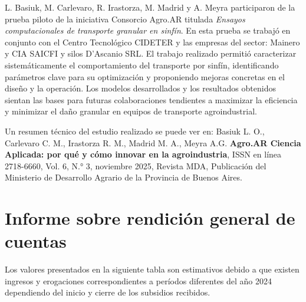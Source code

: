 \documentclass[a4paper,11pt,twoside,final,titlepage,onecolumn,openright]{report}
\begin{document}
L. Basiuk, M. Carlevaro, R. Irastorza, M. Madrid y A. Meyra participaron de la prueba piloto de la iniciativa Consorcio Agro.AR titulada \textit{Ensayos computacionales de transporte granular en sinfín}. En esta prueba se trabajó en conjunto con el Centro Tecnológico CIDETER y las empresas del sector: Mainero y CIA SAICFI y silos D’Ascanio SRL. El trabajo realizado permitió caracterizar sistemáticamente el comportamiento del transporte por sinfín, identificando parámetros clave para su optimización y proponiendo mejoras concretas en el diseño y la operación. Los modelos desarrollados y los resultados obtenidos sientan las bases para futuras colaboraciones tendientes a maximizar la eficiencia y minimizar el daño granular en equipos de transporte agroindustrial.

Un resumen técnico del estudio realizado se puede ver en: Basiuk L. O., Carlevaro C. M., Irastorza R. M., Madrid M. A., Meyra A.G. \textbf{Agro.AR Ciencia Aplicada: por qué y cómo innovar en la agroindustria}, ISSN en línea 2718-6660, Vol. 6, N.° 3, noviembre 2025, Revista MDA, Publicación del Ministerio de Desarrollo Agrario de la Provincia de Buenos Aires.


\chapter{Informe sobre rendición general de cuentas}

Los valores presentados en la siguiente tabla son estimativos debido a que existen ingresos y erogaciones correspondientes a períodos diferentes del año 2024 dependiendo del inicio y cierre de los subsidios recibidos.
\end{document}

